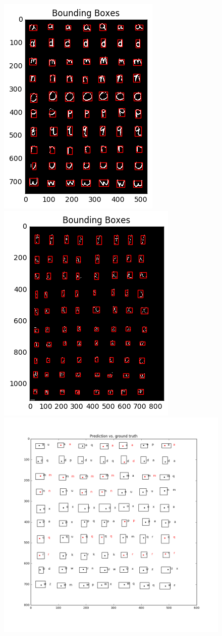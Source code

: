 \documentclass{extarticle}
\theoremstyle{definition}
\theoremstyle{definition}
\begin{document}
\begin{figure}[H]
	\includegraphics[width = 0.5\linewidth]{./figures/test1_Bounding_Boxes_improve_thresholding.png}
	\includegraphics[width = 0.5\linewidth]{./figures/test2_Bounding_Boxes_improve_thresholding.png}
	\includegraphics[width = 0.5\linewidth]{./figures/test1_gt_Prediction_vs_ground_truth_improve_thresholding.png}

\end{figure}
\end{document}
